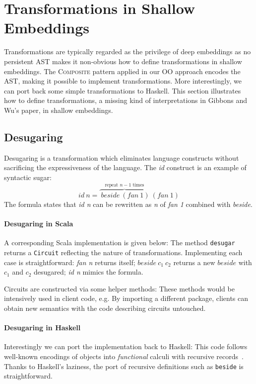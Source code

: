 \section{Transformations in Shallow Embeddings}
Transformations are typically regarded as the privilege of deep embeddings as no
persistent AST makes it non-obvious how to define transformations in shallow embeddings.
The \textsc{Composite} pattern applied in our OO approach encodes the AST, making
it possible to implement transformations. More interestingly, we can port back
some simple transformations to Haskell.
This section illustrates how to define transformations, a missing kind
of interpretations in Gibbons and Wu's paper, in shallow embeddings.

\subsection{Desugaring}
Desugaring is a transformation which eliminates 
language constructs without sacrificing the expressiveness of the language.
The \emph{id} construct is an example of syntactic sugar:
$$id\ n = \overbrace{\ beside\ (fan\ 1)}^{\text{repeat }n-1\text{ times}}\ (fan\ 1)$$
The formula states that \emph{id n} can be rewritten as \emph{n} of \emph{fan 1}
combined with \emph{beside}.

\paragraph{Desugaring in Scala}
A corresponding Scala implementation is given below:
The method \lstinline{desugar} returns a
\lstinline{Circuit} reflecting the nature of transformations.
Implementing each case is straightforward:
\emph{fan n} returns itself; $beside\ c_1\ c_2$ returns a new
$beside$ with $c_1$ and $c_2$ desugared; \emph{id n} mimics the
formula.

Circuits are constructed via some helper methods:
These methods would be intensively used in client code, e.g.
By importing a different package, clients can obtain new semantics with the code
describing circuits untouched.

\paragraph{Desugaring in Haskell}
Interestingly we can port the implementation back to Haskell:
\noindent This code follows well-known encodings of objects into 
\emph{functional} calculi with recursive records~\cite{bruce97comparing}. Thanks 
to Haskell's laziness, the port of recursive definitions such as
\lstinline{beside} is straightforward.  

